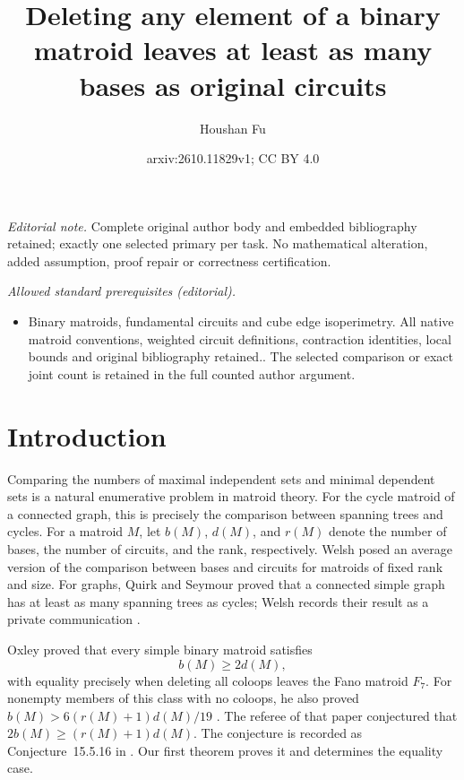 \documentclass[10pt,a4paper]{article}
\title{Deleting any element of a binary matroid leaves at least as many bases as original circuits}
\author{Houshan Fu}
\date{arxiv:2610.11829v1; CC BY 4.0}
\numberwithin{equation}{section}
\begin{document}
\maketitle
\noindent\textit{Editorial note.} Complete original author body and embedded bibliography retained; exactly one selected primary per task. No mathematical alteration, added assumption, proof repair or correctness certification.\par\medskip
\noindent\textit{Allowed standard prerequisites (editorial).}\begin{itemize}
\item Binary matroids, fundamental circuits and cube edge isoperimetry. All native matroid conventions, weighted circuit definitions, contraction identities, local bounds and original bibliography retained.. The selected comparison or exact joint count is retained in the full counted author argument.
\end{itemize}\medskip
\section{Introduction}

Comparing the numbers of maximal independent sets and minimal dependent
sets is a natural enumerative problem in matroid theory. For the cycle
matroid of a connected graph, this is precisely the comparison between
spanning trees and cycles.
For a matroid \(M\), let \(b(M)\), \(d(M)\), and \(r(M)\) denote
the number of bases, the number of circuits, and the rank, respectively.
Welsh \cite[p.~288, Exercise~5]{Welsh1976} posed an average version
of the comparison between bases and circuits for matroids of fixed
rank and size. For graphs, Quirk and Seymour proved that a connected
simple graph has at least as many spanning trees as cycles; Welsh
records their result as a private communication \cite[p.~287]{Welsh1976}.

Oxley \cite[Theorem~2.1]{Oxley1983} proved that every simple binary
matroid satisfies
\begin{equation}\label{eq:oxley}
 b(M)\ge2d(M),
\end{equation}
with equality precisely when deleting all coloops leaves the Fano
matroid \(F_7\). For nonempty members of this class with no coloops,
he also proved \(b(M)>6(r(M)+1)d(M)/19\)
\cite[Theorem~3.1]{Oxley1983}. The referee of that paper conjectured
that \(2b(M)\ge(r(M)+1)d(M)\).
The conjecture is recorded as Conjecture~15.5.16 in \cite{Oxley2011}.
Our first theorem proves it and determines the equality case.
\end{document}
